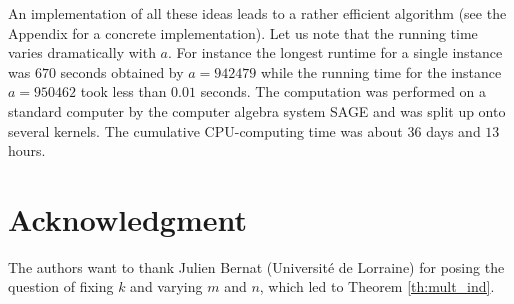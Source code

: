 \documentclass{amsart}
\theoremstyle{plain}
\numberwithin{equation}{section}
\theoremstyle{remark}
\begin{document}
An implementation of all these ideas leads to a rather efficient algorithm (see the Appendix for a concrete implementation). Let us note that the running time 
varies dramatically with $a$. For instance the longest runtime for a single instance was $670$ seconds obtained by $a=942479$ while the running time for the 
instance $a=950462$ took less than $0.01$ seconds. The computation was performed on a standard computer by the computer algebra system SAGE \cite{sage} 
and was split up onto several kernels. The cumulative CPU-computing time was about $36$ days and $13$ hours.

\section*{Acknowledgment}

The authors want to thank Julien Bernat (Universit\'e de Lorraine) for
posing the question of fixing $k$ and varying $m$ and $n$, which
led to Theorem \ref{th:mult_ind}. 
\end{document}
